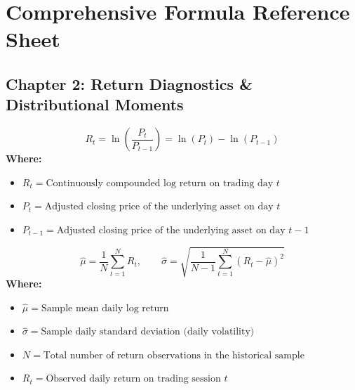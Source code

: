 
\chapter*{Comprehensive Formula Reference Sheet}

\section*{Chapter 2: Return Diagnostics \& Distributional Moments}

\begin{formulabox}
\begin{equation*}
R_t = \ln\left(\frac{P_t}{P_{t-1}}\right) = \ln(P_t) - \ln(P_{t-1})
\end{equation*}
\textbf{Where:}
\begin{itemize}[leftmargin=1.8em, noitemsep]
    \item $R_t = \text{Continuously compounded log return on trading day } t$
    \item $P_t = \text{Adjusted closing price of the underlying asset on day } t$
    \item $P_{t-1} = \text{Adjusted closing price of the underlying asset on day } t-1$
\end{itemize}
\end{formulabox}

\begin{formulabox}
\begin{equation*}
\hat{\mu} = \frac{1}{N}\sum_{t=1}^N R_t, \qquad \hat{\sigma} = \sqrt{\frac{1}{N-1}\sum_{t=1}^N (R_t - \hat{\mu})^2}
\end{equation*}
\textbf{Where:}
\begin{itemize}[leftmargin=1.8em, noitemsep]
    \item $\hat{\mu} = \text{Sample mean daily log return}$
    \item $\hat{\sigma} = \text{Sample daily standard deviation (daily volatility)}$
    \item $N = \text{Total number of return observations in the historical sample}$
    \item $R_t = \text{Observed daily return on trading session } t$
\end{itemize}
\end{formulabox}

